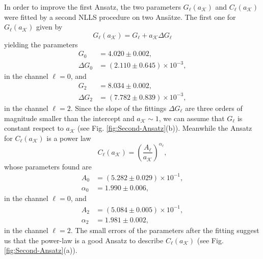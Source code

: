 \documentclass[english,aps,prd,nofootinbib,twocolumn]{revtex4-1}
\begin{document}
In order to improve the first Ansatz, the two parameters $G_{\ell}(a_{\mathcal{K}})$ and $C_{\ell}(a_{\mathcal{K}})$ were fitted by a second NLLS procedure on two Ans\"{a}tze. The first one for $G_{\ell}(a_{\mathcal{K}})$ given by
\begin{equation}
G_{\ell}(a_{\mathcal{K}}) = G_{\ell} + a_{\mathcal{K}}\Delta G_{\ell}
\end{equation}
yielding the parameters
\begin{equation}
\label{tab:Second-Ansatz-G0-L0}
\begin{split}
G_{0}  &= 4.020\pm 0.002,	\\
\Delta G_{0} &= (2.110\pm 0.645)\times 10^{-3},
\end{split}
\end{equation}
in the channel $\ell=0$, and 
\begin{equation}
\label{tab:Second-Ansatz-G0-L2}
\begin{split}
G_{2}  &= 8.034\pm 0.002,	\\
\Delta G_{2} &= (7.782\pm 0.839)\times 10^{-3},
\end{split}
\end{equation}
in the channel $\ell=2$. Since the slope of the fittings $\Delta G_{\ell}$ are three orders of magnitude smaller than the intercept and $a_{\mathcal{K}}\sim 1$, we can assume that $G_{\ell}$ is constant respect to $a_{\mathcal{K}}$ (see Fig. \ref{fig:Second-Ansatz}(b)). Meanwhile the Ansatz for $C_{\ell}(a_{\mathcal{K}})$ is a power law 
\begin{equation}
\label{eq:Second-Ansatz}
C_{\ell}(a_{\mathcal{K}})= \left(\frac{A_{\ell}}{a_{\mathcal{K}}} \right)^{\alpha_{\ell}},
\end{equation}
whose parameters found are 
\begin{equation}
\label{tab:Second-Ansatz-L0}
\begin{split}
A_{0}  &= (5.282\pm 0.029)\times 10^{-1},	\\
\alpha_{0} &=  1.990\pm 0.006,
\end{split}
\end{equation}
in the channel $\ell=0$, and 
\begin{equation}
\label{tab:Second-Ansatz-L2}
\begin{split}
A_{2}  &= (5.084\pm 0.005)\times 10^{-1},	\\
\alpha_{2} &= 1.981\pm 0.002,
\end{split}
\end{equation}
in the channel $\ell=2$. The small errors of the parameters after the fitting suggest us that the power-law is a good Ansatz to describe $C_{\ell}(a_{\mathcal{K}})$ (see Fig. \ref{fig:Second-Ansatz}(a)).
\end{document}
